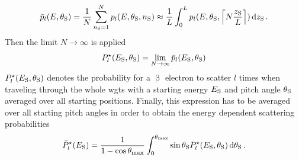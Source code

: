 \begin{equation}
    \label{eq:EnergyDepScatProbsAppendixZAverage}
    \bar{p}_l(E,\theta_\mathrm{S}) = 
    \frac{1}{N}
    \sum_{n_\mathrm{S}=1}^{N} p_l(E,\theta_\mathrm{S},n_\mathrm{S}) \approx
    \frac{1}{L}
    \int_{0}^{L}
        p_l(E,\theta_\mathrm{S},
            \left\lceil N \frac{z_\mathrm{S}}{L}\right\rceil
        )
    \mathop{}\!\mathrm{d} z_\mathrm{S}
    \text{\,.}
\end{equation}
Then the limit $N\rightarrow\infty$ is applied
\begin{equation}
  P^{\star}_l(E_\mathrm{S},\theta_\mathrm{S}) = 
    \lim_{N\rightarrow\infty} \bar{p}_l(E_\mathrm{S},\theta_\mathrm{S})
    \label{eq:energyDepScatProbsAppendix}
\end{equation}
$P^{\star}_l(E_\mathrm{S},\theta_\mathrm{S})$ denotes the probability for a $\upbeta$ electron to scatter $l$ times when traveling through the whole \gls{wgts} with a starting energy $E_\mathrm{S}$ and pitch angle $\theta_\mathrm{S}$ averaged over all starting positions. Finally, this expression has to be averaged over all starting pitch angles in order to obtain the energy dependent scattering probabilities
\begin{equation}
    \bar{P}^{\star}_l(E_\mathrm{S}) = 
    \frac{1}{1-\cos\theta_\mathrm{max}}
    \int_0^{\theta_\mathrm{max}}
    	\sin \theta_\mathrm{S}
        P^{\star}_l(E_\mathrm{S},\theta_\mathrm{S}) 
        \mathop{}\!\mathrm{d} \theta_\mathrm{S}
    \text{\,.}
    \label{eq:averagedEnergyDepScatProbsAppendix}
\end{equation}

